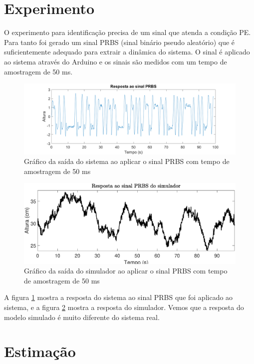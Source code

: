 \section{Experimento}\label{s:4experimento}
O experimento para identificação precisa de um sinal que atenda a condição PE. Para tanto foi gerado um sinal PRBS (sinal binário pseudo aleatório) que é suficientemente adequado para extrair a dinâmica do sistema. O sinal é aplicado ao sistema através do Arduino e os sinais são medidos com um tempo de amostragem de 50 ms.
\begin{figure}[htb]
	\centering
	\includegraphics[width=1\linewidth]{sinalprbsid}
	\caption[Gráfico da saída PRBS do sistema]{Gráfico da saída do sistema ao aplicar o sinal PRBS com tempo de amostragem de 50 ms}
	\label{fig:sinalprbsid}
\end{figure}

\begin{figure}[htb]
	\centering
	\includegraphics[width=1\linewidth]{sinalprbsidsimul}
	\caption[Gráfico da saída PRBS do simulador]{Gráfico da saída do simulador ao aplicar o sinal PRBS com tempo de amostragem de 50 ms}
	\label{fig:sinalprbsidsimul}
\end{figure}


A figura \ref{fig:sinalprbsid} mostra a resposta do sistema ao sinal PRBS que foi aplicado ao sistema, e a figura \ref{fig:sinalprbsidsimul} mostra a resposta do simulador. Vemos que a resposta do modelo simulado é muito diferente do sistema real.

\section{Estimação}\label{s:4estimacao}

